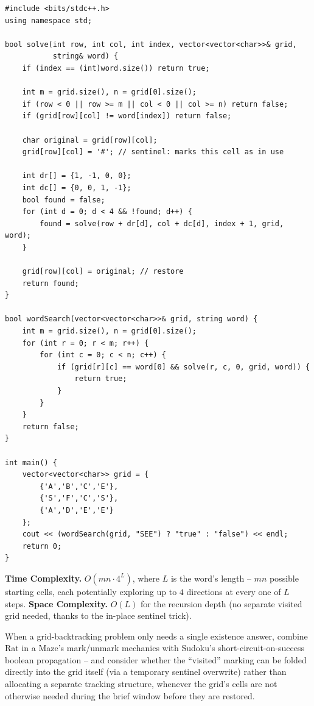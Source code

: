 \begin{lstlisting}
#include <bits/stdc++.h>
using namespace std;

bool solve(int row, int col, int index, vector<vector<char>>& grid,
           string& word) {
    if (index == (int)word.size()) return true;

    int m = grid.size(), n = grid[0].size();
    if (row < 0 || row >= m || col < 0 || col >= n) return false;
    if (grid[row][col] != word[index]) return false;

    char original = grid[row][col];
    grid[row][col] = '#'; // sentinel: marks this cell as in use

    int dr[] = {1, -1, 0, 0};
    int dc[] = {0, 0, 1, -1};
    bool found = false;
    for (int d = 0; d < 4 && !found; d++) {
        found = solve(row + dr[d], col + dc[d], index + 1, grid, word);
    }

    grid[row][col] = original; // restore
    return found;
}

bool wordSearch(vector<vector<char>>& grid, string word) {
    int m = grid.size(), n = grid[0].size();
    for (int r = 0; r < m; r++) {
        for (int c = 0; c < n; c++) {
            if (grid[r][c] == word[0] && solve(r, c, 0, grid, word)) {
                return true;
            }
        }
    }
    return false;
}

int main() {
    vector<vector<char>> grid = {
        {'A','B','C','E'},
        {'S','F','C','S'},
        {'A','D','E','E'}
    };
    cout << (wordSearch(grid, "SEE") ? "true" : "false") << endl;
    return 0;
}
\end{lstlisting}

\begin{complexitybox}
\textbf{Time Complexity.} $O(mn \cdot 4^L)$, where $L$ is the word's
length -- $mn$ possible starting cells, each potentially exploring up to
$4$ directions at every one of $L$ steps.
\textbf{Space Complexity.} $O(L)$ for the recursion depth (no separate
visited grid needed, thanks to the in-place sentinel trick).
\end{complexitybox}

\begin{takeawaybox}
When a grid-backtracking problem only needs a single existence answer,
combine Rat in a Maze's mark/unmark mechanics with Sudoku's
short-circuit-on-success boolean propagation -- and consider whether the
``visited'' marking can be folded directly into the grid itself (via a
temporary sentinel overwrite) rather than allocating a separate
tracking structure, whenever the grid's cells are not otherwise needed
during the brief window before they are restored.
\end{takeawaybox}

